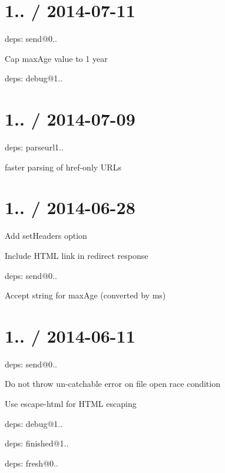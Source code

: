 \section*{1.. / 2014-\/07-\/11 }


\begin{DoxyItemize}
\item deps\+: send@0..
\begin{DoxyItemize}
\item Cap {\ttfamily max\+Age} value to 1 year
\item deps\+: debug@1..
\end{DoxyItemize}
\end{DoxyItemize}

\section*{1.. / 2014-\/07-\/09 }


\begin{DoxyItemize}
\item deps\+: parseurl1..
\begin{DoxyItemize}
\item faster parsing of href-\/only U\+R\+Ls
\end{DoxyItemize}
\end{DoxyItemize}

\section*{1.. / 2014-\/06-\/28 }


\begin{DoxyItemize}
\item Add {\ttfamily set\+Headers} option
\item Include H\+T\+M\+L link in redirect response
\item deps\+: send@0..
\begin{DoxyItemize}
\item Accept string for {\ttfamily max\+Age} (converted by {\ttfamily ms})
\end{DoxyItemize}
\end{DoxyItemize}

\section*{1.. / 2014-\/06-\/11 }


\begin{DoxyItemize}
\item deps\+: send@0..
\begin{DoxyItemize}
\item Do not throw un-\/catchable error on file open race condition
\item Use {\ttfamily escape-\/html} for H\+T\+M\+L escaping
\item deps\+: debug@1..
\item deps\+: finished@1..
\item deps\+: fresh@0..
\end{DoxyItemize}
\end{DoxyItemize}

